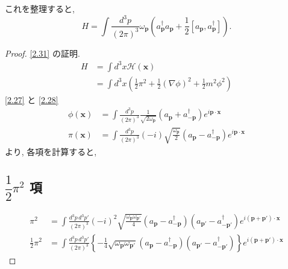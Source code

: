 \documentclass[a4paper,12pt]{article}
\begin{document}
これを整理すると,
\begin{equation*}\label{2.31}
H = \int \frac{d^3p}{(2\pi)^3} \omega_{\mathbf{p}} \left( a^\dagger_{\mathbf{p}} a_{\mathbf{p}} + \frac{1}{2} [a_{\mathbf{p}}, a^\dagger_{\mathbf{p}}] \right). \tag{2.31}
\end{equation*}

\color{blue}
\begin{proof}
\eqref{2.31} の証明.
\begin{align*}
H &= \int d^3x \mathcal{H}(\mathbf{x}) \tag{2-3.j1} \\
&= \int d^3x \left( \frac{1}{2} \pi^2 + \frac{1}{2} (\nabla \phi)^2 + \frac{1}{2} m^2 \phi^2 \right) \tag{2-3.j2}
\end{align*}
\eqref{2.27} と \eqref{2.28}
\begin{align*}
    \phi (\mathbf{x}) &= \int \frac{d^3p}{(2\pi)^3} \frac{1}{\sqrt{2\omega_{\mathbf{p}}}} \left( a_{\mathbf{p}}  + a^\dagger_{-\mathbf{p}} \right) e^{i\mathbf{p}\cdot\mathbf{x}} \tag{2-3.j3}\\
    \pi(\mathbf{x}) &= \int \frac{d^3p}{(2\pi)^3} \left( -i \right) \sqrt{\frac{\omega_{\mathbf{p}}}{2}} (a_{\mathbf{p}} - a^\dagger_{-\mathbf{p}}) e^{i\mathbf{p}\cdot\mathbf{x}} \tag{2-3.j4}
\end{align*}
より, 各項を計算すると,
\subsection*{$\dfrac{1}{2} \pi^2$ 項}
\begin{align*}
    \pi^2 &= \int \frac{d^3 p \, d^3 p'}{(2\pi)^3} (-i)^2 \sqrt{\frac{\omega_{\mathbf{p}}\omega_{\mathbf{p}'}}{4}} (a_{\mathbf{p}} - a^\dagger_{-\mathbf{p}})(a_{\mathbf{p}'} - a^\dagger_{-\mathbf{p}'}) e^{i(\mathbf{p}+\mathbf{p}')\cdot\mathbf{x}} \tag{2-3.j5}\\
    \frac{1}{2} \pi^2 &= \int \frac{d^3 p \, d^3 p'}{(2\pi)^3} \left\{-\frac{1}{4} \sqrt{\omega_{\mathbf{p}}\omega_{\mathbf{p}'}} (a_{\mathbf{p}} - a^\dagger_{-\mathbf{p}})(a_{\mathbf{p}'} - a^\dagger_{-\mathbf{p}'})\right\} e^{i(\mathbf{p}+\mathbf{p}')\cdot\mathbf{x}} \tag{2-3.j6}
\end{align*}

\end{proof}
\end{document}
